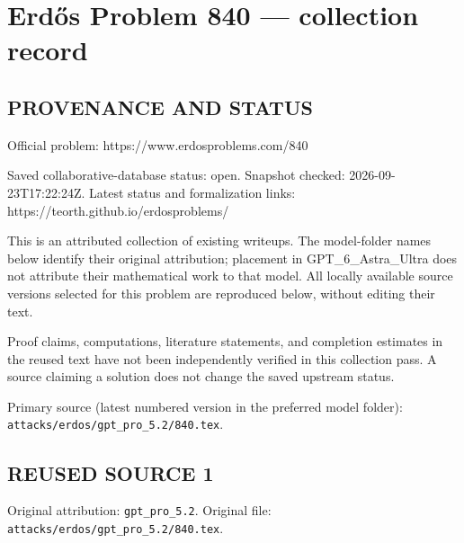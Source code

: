 \section*{Erd\H{o}s Problem 840 --- collection record}

\subsection*{PROVENANCE AND STATUS}
Official problem: https://www.erdosproblems.com/840

Saved collaborative-database status: open.
Snapshot checked: 2026-09-23T17:22:24Z.
Latest status and formalization links: https://teorth.github.io/erdosproblems/

This is an attributed collection of existing writeups. The model-folder names below identify their original attribution; placement in GPT\_6\_Astra\_Ultra does not attribute their mathematical work to that model. All locally available source versions selected for this problem are reproduced below, without editing their text.

Proof claims, computations, literature statements, and completion estimates in the reused text have not been independently verified in this collection pass. A source claiming a solution does not change the saved upstream status.

Primary source (latest numbered version in the preferred model folder): \texttt{attacks/erdos/gpt\_pro\_5.2/840.tex}.

\subsection*{REUSED SOURCE 1}
Original attribution: \texttt{gpt\_pro\_5.2}.
Original file: \texttt{attacks/erdos/gpt\_pro\_5.2/840.tex}.


